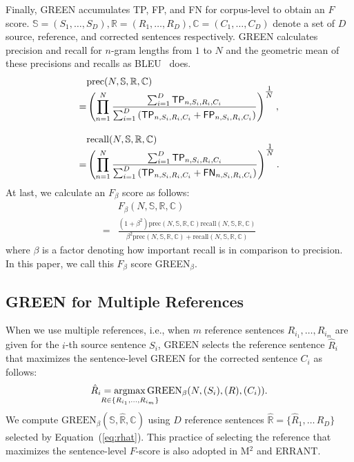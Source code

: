 \documentclass[11pt]{article}
\begin{document}
Finally, GREEN accumulates \textsf{TP}, \textsf{FP}, and \textsf{FN} for corpus-level to obtain an $F$ score.
$\mathbb{S} = (S_1, \ldots, S_D), \mathbb{R} = (R_1, \ldots, R_D), \mathbb{C} = (C_1, \ldots, C_D)$ denote a set of $D$ source, reference, and corrected sentences respectively.
GREEN calculates precision and recall for $n$-gram lengths from $1$ to $N$ and the geometric mean of these precisions and recalls as BLEU~\citep{papineni-etal-2002-bleu} does.
\begingroup
\allowdisplaybreaks
\begin{align*}
    & \mathrm{prec} (N, \mathbb{S}, \mathbb{R}, \mathbb{C}) \\[-2\jot]
    = & \left( \prod_{n=1}^{N}
    \frac{
        \sum_{i=1}^{D} \textsf{TP}_{n, S_i, R_i, C_i}
    }{
        \sum_{i=1}^{D} \left( \textsf{TP}_{n, S_i, R_i, C_i} + \textsf{FP}_{n, S_i, R_i, C_i} \right)
    }
    \right)^{\tfrac{1}{N}}, \\[3\jot]
    & \mathrm{recall} (N, \mathbb{S}, \mathbb{R}, \mathbb{C}) \\[-2\jot]
    = & \left( \prod_{n=1}^{N}
    \frac{
        \sum_{i=1}^{D} \textsf{TP}_{n, S_i, R_i, C_i}
    }{
        \sum_{i=1}^{D} \left( \textsf{TP}_{n, S_i, R_i, C_i} + \textsf{FN}_{n, S_i, R_i, C_i} \right)
    }
    \right)^{\tfrac{1}{N}}.
\end{align*}
\endgroup
At last, we calculate an $F_{\beta}$ score as follows:
\begingroup
\allowdisplaybreaks
\begin{align*}
    & F_{\beta} (N, \mathbb{S}, \mathbb{R}, \mathbb{C}) \\
    = &
    \frac{
        (1+\beta^2) \mathrm{prec} (N, \mathbb{S}, \mathbb{R}, \mathbb{C})  \mathrm{recall} (N, \mathbb{S}, \mathbb{R}, \mathbb{C})
    }{
        \beta^2 \mathrm{prec} (N, \mathbb{S}, \mathbb{R}, \mathbb{C}) + \mathrm{recall} (N, \mathbb{S}, \mathbb{R}, \mathbb{C})
    }
\end{align*}
where $\beta$ is a factor denoting how important recall is in comparison to precision.
\endgroup
In this paper, we call this $F_{\beta}$ score GREEN${}_{\beta}$.

\subsection{GREEN for Multiple References}
\label{sec:multiple_references}

When we use multiple references, i.e., when $m$ reference sentences $R_{i_1},\ldots,R_{i_m}$ are given for the $i$-th source sentence $S_i$, GREEN selects the reference sentence $\hat{R}_i$ that maximizes the sentence-level GREEN for the corrected sentence $C_i$ as follows:
\begin{equation}
    \hat{R}_i = \operatorname*{argmax}_{\mathclap{R \in \{R_{i_1}, \ldots, R_{i_m}\}}} \mathrm{GREEN}_{\beta}(N, (S_i), (R), (C_i)).
    \label{eq:rhat}
\end{equation}
We compute $\mathrm{GREEN}_{\beta}(\mathbb{S}, \hat{\mathbb{R}}, \mathbb{C})$ using $D$ reference sentences $\hat{\mathbb{R}} = \{\hat{R}_1, \ldots\, \hat{R}_D\}$ selected by Equation~(\ref{eq:rhat}).
This practice of selecting the reference that maximizes the sentence-level $F$-score is also adopted in M${}^2$ and ERRANT.
\end{document}
